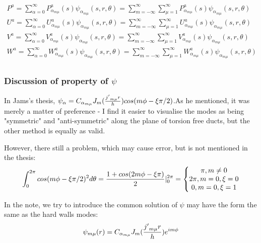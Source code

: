 \documentclass{Note}
\begin{document}
\begin{equation}
\begin{aligned}
P^a=\sum_{\alpha=0}^{\infty}P_{\alpha_{m\mu}}^a(s)\psi_{\alpha_{m\mu}} (s,r,\theta)=\sum_{m=-\infty}^\infty \sum_{\mu=1}^\infty P_{\alpha_{m\mu}}^a(s)\psi_{\alpha_{m\mu}}(s,r,\theta)\\
U^a=\sum_{\alpha=0}^{\infty}U_{\alpha_{m\mu}}^a(s)\psi_{\alpha_{m\mu}} (s,r,\theta)=\sum_{m=-\infty}^\infty \sum_{\mu=1}^\infty U_{\alpha_{m\mu}}^a(s)\psi_{\alpha_{m\mu}}(s,r,\theta)\\
V^a=\sum_{\alpha=0}^{\infty}V_{\alpha_{m\mu}}^a(s)\psi_{\alpha_{m\mu}} (s,r,\theta)=\sum_{m=-\infty}^\infty \sum_{\mu=1}^\infty V_{\alpha_{m\mu}}^a(s)\psi_{\alpha_{m\mu}}(s,r,\theta)\\
W^a=\sum_{\alpha=0}^{\infty}W_{\alpha_{m\mu}}^a(s)\psi_{\alpha_{m\mu}} (s,r,\theta)=\sum_{m=-\infty}^\infty \sum_{\mu=1}^\infty W_{\alpha_{m\mu}}^a(s)\psi_{\alpha_{m\mu}}(s,r,\theta)\\
\end{aligned}
\end{equation}




\subsubsection{Discussion of property of $\psi$}
In Jams's thesis, $\psi_\alpha=C_{\alpha_{m\mu}}J_m({{j'}_{m\mu} r\over h})cos(m\phi-\xi\pi/2)$.As he mentioned, it was merely a matter of preference  - I find it easier to visualise the modes as being "symmetric" and "anti-symmetric" along the plane of torsion free ducts, but the other method is equally as valid. 

However, there still a problem, which may cause error, but is not mentioned in the thesis:\\
\begin{equation}
\begin{aligned}
\int_0^{2\pi} cos(m\phi-\xi\pi/2)^2 d\theta={1+cos(2m\phi-\xi \pi)\over 2}|_0^{2\pi}=\left\{\begin{matrix}
\pi,m\neq 0\\
2\pi,m=0,\xi=0\\
0,m=0,\xi=1
\end{matrix}\right.
\end{aligned}
\end{equation}

In the note, we try to introduce the common solution of $\psi$ may have the form the same as the hard walls modes:
\begin{equation}
\begin{aligned}
\psi_{m\mu}(r)=C_{\alpha_{m\mu}}J_m({{j'}_{m\mu} r\over h})e^{im\phi}
\end{aligned}
\end{equation}
\end{document}

